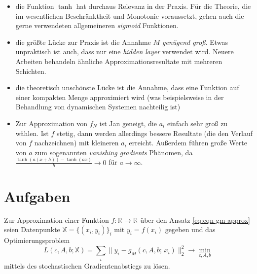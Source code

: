 \documentclass[
]{book}
\providecommand{\tightlist}{%
  \setlength{\itemsep}{0pt}\setlength{\parskip}{0pt}}
\theoremstyle{definition}
\theoremstyle{definition}
\theoremstyle{definition}
\theoremstyle{definition}
\theoremstyle{remark}
\begin{document}
\begin{itemize}
\tightlist
\item
  die Funktion \(\tanh\) hat durchaus Relevanz in der Praxis. Für die
  Theorie, die im wesentlichen Beschränktheit und Monotonie voraussetzt,
  gehen auch die gerne verwendeten allgemeineren \emph{sigmoid} Funktionen.
\item
  die größte Lücke zur Praxis ist die Annahme \emph{\(M\) genügend
  groß}. Etwas unpraktisch ist auch, dass nur eine \emph{hidden layer}
  verwendet wird. Neuere Arbeiten behandeln ähnliche
  Approximationsresultate mit mehreren Schichten.
\item
  die theoretisch unschönste Lücke ist die Annahme, dass eine Funktion
  auf einer kompakten Menge approximiert wird (was beispielsweise in der
  Behandlung von dynamischen Systemen nachteilig ist)
\item
  Zur Approximation von \(f_N\) ist Jan geneigt, die \(a_i\) einfach sehr groß
  zu wählen. Ist \(f\) stetig, dann werden allerdings bessere Resultate (die
  den Verlauf von \(f\) nachzeichnen) mit kleineren \(a_i\) erreicht. Außerdem
  führen große Werte von \(a\) zum sogenannten \emph{vanishing gradients}
  Phänomen, da \(\frac{\tanh(a(x+h))-\tanh(ax)}{h}\to 0\) für \(a\to \infty\).
\end{itemize}

\hypertarget{aufgaben-2}{%
\section{Aufgaben}\label{aufgaben-2}}

Zur Approximation einer Funktion \(f\colon \mathbb  R^{}\to \mathbb R^{}\) über den Ansatz \eqref{eq:eqn-gm-approx} seien
Datenpunkte \(\mathbb X = \{(x_i, y_i)\}_i\) mit \(y_i=f(x_i)\) gegeben und das
Optimierungsproblem
\begin{equation*}
   L(c, A, b; \mathbb X) = \sum_{i} \|y_i - g_M(c, A, b;\, x_i)\|_2^2 \to \min_{c, A, b}
   \end{equation*}
mittels des stochastischen Gradientenabstiegs zu lösen.
\end{document}

